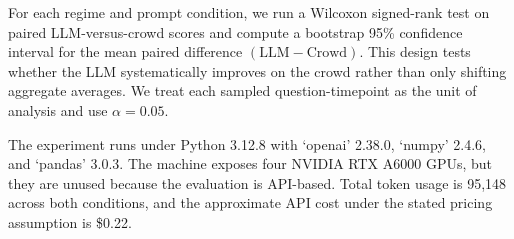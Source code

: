 For each regime and prompt condition, we run a Wilcoxon signed-rank test on paired LLM-versus-crowd \brier scores and compute a bootstrap 95\% confidence interval for the mean paired difference $(\text{LLM} - \text{Crowd})$. This design tests whether the LLM systematically improves on the crowd rather than only shifting aggregate averages. We treat each sampled question-timepoint as the unit of analysis and use $\alpha=0.05$.

 The experiment runs under Python 3.12.8 with `openai' 2.38.0, `numpy' 2.4.6, and `pandas' 3.0.3. The machine exposes four NVIDIA RTX A6000 GPUs, but they are unused because the evaluation is API-based. Total token usage is 95,148 across both conditions, and the approximate API cost under the stated pricing assumption is \$0.22.





